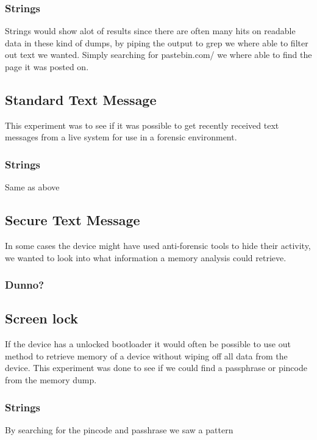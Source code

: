 \subsubsection{Strings}
Strings would show alot of results since there are often many hits on readable data in these kind of dumps, by piping the output to grep we where able to filter out text we wanted. Simply searching for pastebin.com/ we where able to find the page it was posted on. %

\subsection{Standard Text Message}
This experiment was to see if it was possible to get recently received text messages from a live system for use in a forensic environment.
\subsubsection{Strings}
Same as above %
\subsection{Secure Text Message}
In some cases the device might have used anti-forensic tools to hide their activity, we wanted to look into what information a memory analysis could retrieve.
\subsubsection{Dunno?}
\subsection{Screen lock}
If the device has a unlocked bootloader it would often be possible to use out method to retrieve memory of a device without wiping off all data from the device. This experiment was done to see if we could find a passphrase or pincode from the memory dump.
\subsubsection{Strings}
By searching for the pincode and passhrase we saw a pattern %

